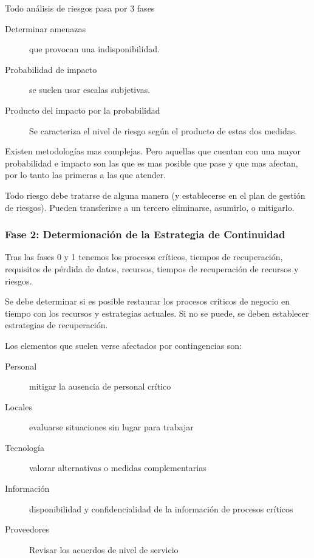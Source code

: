             Todo análisis de riesgos pasa por 3 fases
            \begin{description}
                \item[Determinar amenazas] que provocan una indisponibilidad.
                \item[Probabilidad de impacto] se suelen usar escalas subjetivas.
                \item[Producto del impacto por la probabilidad] Se caracteriza el nivel de riesgo según el producto de estas dos medidas.
            \end{description}
            Existen metodologías mas complejas. Pero aquellas que cuentan con una mayor probabilidad e impacto son las que es mas posible que pase y que mas afectan, por lo tanto las primeras a las que atender.

            Todo riesgo debe tratarse de alguna manera (y establecerse en el plan de gestión de riesgos). Pueden transferirse a un tercero eliminarse, asumirlo, o mitigarlo.

    \subsubsection{Fase 2: Determionación de la Estrategia de Continuidad} %

        Tras las fases 0 y 1 tenemos los procesos críticos, tiempos de recuperación, requisitos de pérdida de datos, recursos, tiempos de recuperación de recursos y riesgos.

        Se debe determinar si es posible restaurar los procesos críticos de negocio en tiempo con los recursos y estrategias actuales. Si no se puede, se deben establecer estrategias de recuperación.

        Los elementos que suelen verse afectados por contingencias son:
        \begin{description}
            \item[Personal] mitigar la ausencia de personal crítico
            \item[Locales]evaluarse situaciones sin lugar para trabajar
            \item[Tecnología] valorar alternativas o medidas complementarias
            \item[Información] disponibilidad y confidencialidad de la información de procesos críticos
            \item[Proveedores] Revisar los acuerdos de nivel de servicio
        \end{description}

